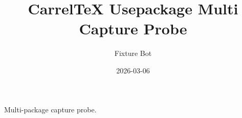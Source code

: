 \documentclass{article}
\title{CarrelTeX Usepackage Multi Capture Probe}
\author{Fixture Bot}
\date{2026-03-06}
\begin{document}
\maketitle

Multi-package capture probe.
\end{document}
